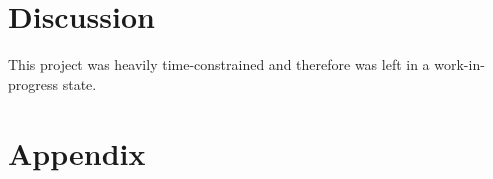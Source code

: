 \documentclass{article}
\begin{document}
\section{Discussion}
This project was heavily time-constrained and therefore was left in a work-in-progress state.






\section{Appendix}


\pagebreak


\end{document}
